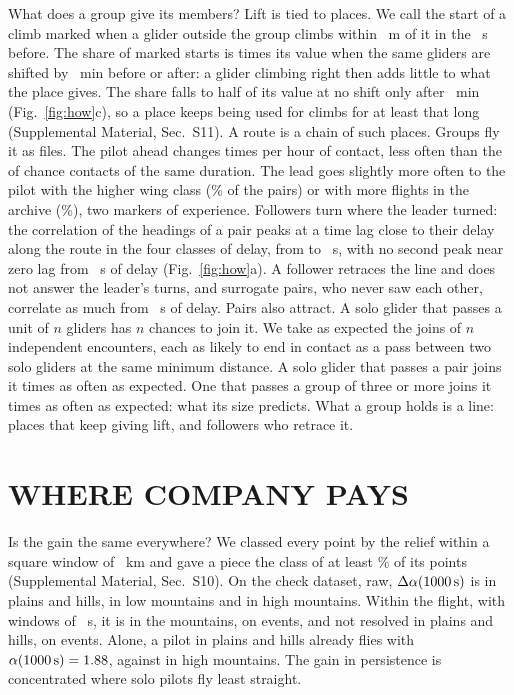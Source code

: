 \documentclass[aps,prl,twocolumn,superscriptaddress,nofootinbib]{revtex4-2}
\newcommand{\SM}[1]{Supplemental Material, Sec.~S#1}
\newcommand{\aK}{\alpha(\LtLagOne\,\mathrm{s})}
\begin{document}
What does a group give its members? Lift is tied to places. We call the start of a climb marked
when a glider outside the group climbs within \StMkR~m of it in the \StMkDT~s before. The share of
marked starts is \StMkNowGroup{} times its value when the same gliders are shifted by
\StMkNear~min before or after: a glider climbing right then adds little to what the place gives.
The share falls to half of its value at no shift only after \StMkHalfGroup~min (Fig.~\ref{fig:how}c), so a place keeps
being used for climbs for at least that long (\SM{11}). A route is a chain of such places. Groups
fly it as files. The pilot ahead changes \StSwitches{} times per hour of contact, less often than
the \StSwitchesChance{} of chance contacts of the same duration. The lead goes slightly more often
to the pilot with the higher wing class (\StWing\% of the pairs) or with more flights in the
archive (\StExp\%), two markers of experience. Followers turn where the leader turned: the
correlation of the headings of a pair peaks at a time lag close to their delay along the route in
the four classes of delay, from \StHdLOne{} to \StHdLFour~s, with no second peak near zero lag from
\StHdLTwo~s of delay (Fig.~\ref{fig:how}a). A follower retraces the line and does not answer the
leader's turns, and surrogate pairs, who never saw each other, correlate as much from
\StHdLChanceThree~s of delay. Pairs also attract. A solo glider that passes a unit of $n$ gliders has $n$ chances to join it. We
take as expected the joins of $n$ independent encounters, each as likely to end in contact as a pass
between two solo gliders at the same minimum distance. A solo glider that passes a pair joins it
\StEnSoloPair{} \StEnSoloPairBand{} times as often as expected. One that passes a group of three or
more joins it \StEnSoloThree{} \StEnSoloThreeBand{} times as often as expected: what its size predicts. What a group holds is a line: places that
keep giving lift, and followers who retrace it.

\section*{WHERE COMPANY PAYS}

Is the gain the same everywhere? We classed every point by the relief within a square window of
\TnWindowKm~km and gave a piece the class of at least \TnMajority\% of its points (\SM{10}). On the
check dataset, raw, $\Delta\aK$ is \LtTerRawLow{} in plains and hills, \LtTerRawLowMtn{} in low
mountains and \LtTerRawHigh{} in high mountains. Within the flight, with
windows of \LtWinMid~s, it is \LtTerFlightMtn{} \LtTerFlightMtnBand{} in the mountains, on
\LtTerFlightMtnEvents{} events, and not resolved in plains and hills, on \LtTerFlightLowEvents{}
events. Alone, a pilot in plains and hills already flies with $\aK = \LtTerAlphaSLow$, against
\LtTerAlphaSHigh{} in high mountains. The gain in persistence is concentrated where solo pilots fly
least straight.
\end{document}
